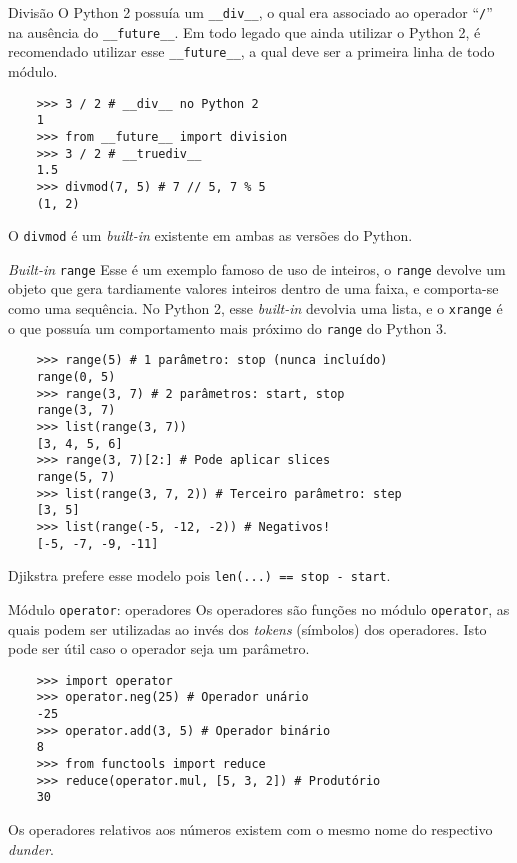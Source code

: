 \documentclass[utf8]{beamer}
\begin{document}
\begin{frame}[fragile]{Divisão}
  O Python 2 possuía um \texttt{__div__},
  o qual era associado ao operador ``\texttt{/}''
  na ausência do \texttt{__future__}.
  Em todo legado que ainda utilizar o Python 2,
  é recomendado utilizar esse \texttt{__future__},
  a qual deve ser a primeira linha de todo módulo.

  \begin{verbatim}
    >>> 3 / 2 # __div__ no Python 2
    1
    >>> from __future__ import division
    >>> 3 / 2 # __truediv__
    1.5
    >>> divmod(7, 5) # 7 // 5, 7 % 5
    (1, 2)
  \end{verbatim}

  O \texttt{divmod} é um \emph{built-in}
  existente em ambas as versões do Python.

\end{frame}


\begin{frame}[fragile]{\emph{Built-in} \texttt{range}}
  Esse é um exemplo famoso de uso de inteiros,
  o \texttt{range} devolve um objeto que gera
  tardiamente valores inteiros dentro de uma faixa,
  e comporta-se como uma sequência.
  No Python 2, esse \emph{built-in} devolvia uma lista,
  e o \texttt{xrange} é o que possuía um comportamento
  mais próximo do \texttt{range} do Python 3.

  \begin{verbatim}
    >>> range(5) # 1 parâmetro: stop (nunca incluído)
    range(0, 5)
    >>> range(3, 7) # 2 parâmetros: start, stop
    range(3, 7)
    >>> list(range(3, 7))
    [3, 4, 5, 6]
    >>> range(3, 7)[2:] # Pode aplicar slices
    range(5, 7)
    >>> list(range(3, 7, 2)) # Terceiro parâmetro: step
    [3, 5]
    >>> list(range(-5, -12, -2)) # Negativos!
    [-5, -7, -9, -11]
  \end{verbatim}

  Djikstra prefere esse modelo pois
  \texttt{len(...) == stop - start}.
\end{frame}


\begin{frame}[fragile]{Módulo \texttt{operator}: operadores}
  Os operadores são funções no módulo \texttt{operator},
  as quais podem ser utilizadas
  ao invés dos \emph{tokens} (símbolos) dos operadores.
  Isto pode ser útil caso o operador seja um parâmetro.

  \begin{verbatim}
    >>> import operator
    >>> operator.neg(25) # Operador unário
    -25
    >>> operator.add(3, 5) # Operador binário
    8
    >>> from functools import reduce
    >>> reduce(operator.mul, [5, 3, 2]) # Produtório
    30
  \end{verbatim}

  Os operadores relativos aos números existem com o mesmo nome do
  respectivo \emph{dunder}.
\end{frame}
\end{document}
